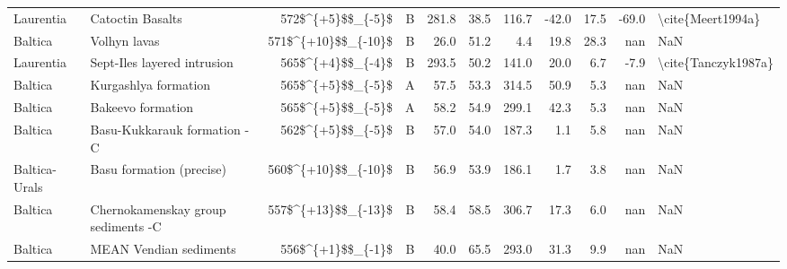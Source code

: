 \begin{longtable}{p{1 in}p{1 in}rrrrrrrr}
                     Laurentia &                                   Catoctin Basalts &      572\$\textasciicircum \{+5\}\$\$\_\{-5\}\$ &      B &     281.8 &      38.5 & 116.7 & -42.0 &      17.5 &       -69.0 &                                  \textbackslash cite\{Meert1994a\} \\
                       Baltica &                                       Volhyn lavas &    571\$\textasciicircum \{+10\}\$\$\_\{-10\}\$ &      B &      26.0 &      51.2 &   4.4 &  19.8 &      28.3 &         nan &                                                NaN \\
                     Laurentia &                        Sept-Iles layered intrusion &      565\$\textasciicircum \{+4\}\$\$\_\{-4\}\$ &      B &     293.5 &      50.2 & 141.0 &  20.0 &       6.7 &        -7.9 &                                \textbackslash cite\{Tanczyk1987a\} \\
                       Baltica &                               Kurgashlya formation &      565\$\textasciicircum \{+5\}\$\$\_\{-5\}\$ &      A &      57.5 &      53.3 & 314.5 &  50.9 &       5.3 &         nan &                                                NaN \\
                       Baltica &                                  Bakeevo formation &      565\$\textasciicircum \{+5\}\$\$\_\{-5\}\$ &      A &      58.2 &      54.9 & 299.1 &  42.3 &       5.3 &         nan &                                                NaN \\
                       Baltica &                        Basu-Kukkarauk formation -C &      562\$\textasciicircum \{+5\}\$\$\_\{-5\}\$ &      B &      57.0 &      54.0 & 187.3 &   1.1 &       5.8 &         nan &                                                NaN \\
                 Baltica-Urals &                          Basu formation  (precise) &    560\$\textasciicircum \{+10\}\$\$\_\{-10\}\$ &      B &      56.9 &      53.9 & 186.1 &   1.7 &       3.8 &         nan &                                                NaN \\
                       Baltica &                 Chernokamenskay group sediments -C &    557\$\textasciicircum \{+13\}\$\$\_\{-13\}\$ &      B &      58.4 &      58.5 & 306.7 &  17.3 &       6.0 &         nan &                                                NaN \\
                       Baltica &                             MEAN Vendian sediments &      556\$\textasciicircum \{+1\}\$\$\_\{-1\}\$ &      B &      40.0 &      65.5 & 293.0 &  31.3 &       9.9 &         nan &                                                NaN \\

\end{longtable}
